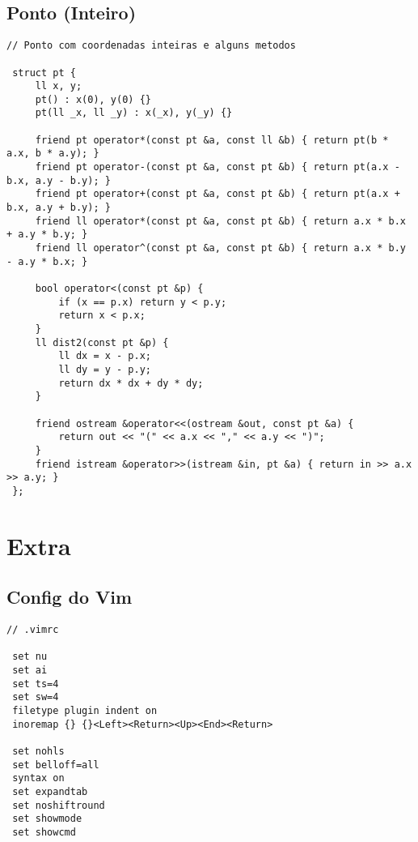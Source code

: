 \documentclass[11pt, a4paper, twoside]{article}
\begin{document}
\subsection{Ponto (Inteiro)}
\begin{lstlisting}
// Ponto com coordenadas inteiras e alguns metodos

 struct pt {
     ll x, y;
     pt() : x(0), y(0) {}
     pt(ll _x, ll _y) : x(_x), y(_y) {}
 
     friend pt operator*(const pt &a, const ll &b) { return pt(b * a.x, b * a.y); }
     friend pt operator-(const pt &a, const pt &b) { return pt(a.x - b.x, a.y - b.y); }
     friend pt operator+(const pt &a, const pt &b) { return pt(a.x + b.x, a.y + b.y); }
     friend ll operator*(const pt &a, const pt &b) { return a.x * b.x + a.y * b.y; }
     friend ll operator^(const pt &a, const pt &b) { return a.x * b.y - a.y * b.x; }
 
     bool operator<(const pt &p) {
         if (x == p.x) return y < p.y;
         return x < p.x;
     }
     ll dist2(const pt &p) {
         ll dx = x - p.x;
         ll dy = y - p.y;
         return dx * dx + dy * dy;
     }
 
     friend ostream &operator<<(ostream &out, const pt &a) {
         return out << "(" << a.x << "," << a.y << ")";
     }
     friend istream &operator>>(istream &in, pt &a) { return in >> a.x >> a.y; }
 };
\end{lstlisting}

\pagebreak


%
%

\section{Extra}

\subsection{Config do Vim}
\begin{lstlisting}
// .vimrc

 set nu
 set ai
 set ts=4
 set sw=4
 filetype plugin indent on
 inoremap {} {}<Left><Return><Up><End><Return> 
 
 set nohls
 set belloff=all
 syntax on
 set expandtab
 set noshiftround
 set showmode
 set showcmd
\end{lstlisting}
\end{document}
